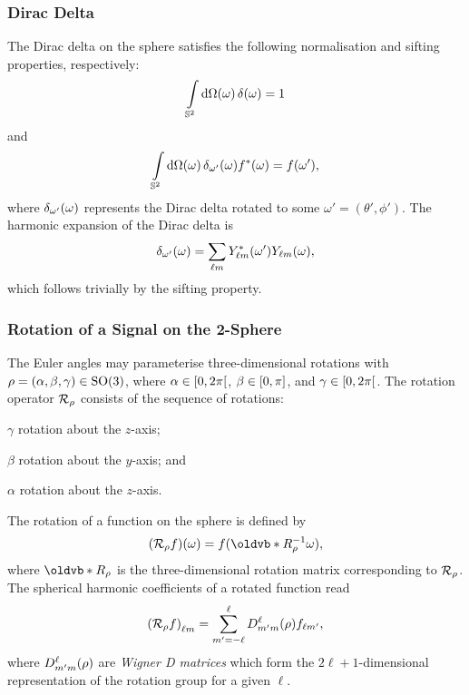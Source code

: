 \subsubsection{Dirac Delta}

The Dirac delta on the sphere satisfies the following normalisation and sifting properties, respectively:
%
\begin{equation}
	\integrateSphere{\omega} \pixel{\delta}
	= 1
\end{equation}
%
and
%
\begin{equation}
	\integrateSphere{\omega} \pixel{\delta_{\omega'}} \pixel{\conj{f}}
	= \pixel[']{f},
\end{equation}
%
where \(\pixel{\delta_{\omega'}}\) represents the Dirac delta rotated to some \(\omega'=(\theta',\phi')\).
The harmonic expansion of the Dirac delta is
%
\begin{equation}\label{eq:chapter2_dirac_omega}
	\pixel{\delta_{\omega'}}
	= \harmonicSum \pixel[']{\conj{\harmonic{Y}}} \pixel{\harmonic{Y}},
\end{equation}
%
which follows trivially by the sifting property.

\subsubsection{Rotation of a Signal on the 2-Sphere}

The Euler angles may parameterise three-dimensional rotations with \(\rho = (\alpha,\beta,\gamma) \in \rotationGroup{}\), where \(\alpha \in \interval[open right]{0}{2\pi}\), \(\beta \in \interval{0}{\pi}\), and \(\gamma \in \interval[open right]{0}{2\pi}\).
The rotation operator \(\rotation{\rho}\) consists of the sequence of rotations:
%
\begin{inparaenum}[(i)]
	\item \({\gamma}\) rotation about the \(z\)-axis;
	\item \({\beta}\) rotation about the \(y\)-axis; and
	\item \({\alpha}\) rotation about the \(z\)-axis.
\end{inparaenum}
%
The rotation of a function on the sphere is defined by
%
\begin{equation}
	\pixel{(\rotation{\rho}f)}
	= f(\vb{R}_{\rho}^{-1} \omega),
\end{equation}
%
where \(\vb{R}_{\rho}\) is the three-dimensional rotation matrix corresponding to \(\rotation{\rho}\).
The spherical harmonic coefficients of a rotated function read
%
\begin{equation}\label{eq:chapter2_rotation_matrix}
	\harmonic{(\rotation{\rho}f)}
	= \sum\limits_{m'=-\ell}^{\ell} \wigner{\ell}{m'}{m}(\rho) f_{\ell m'},
\end{equation}
%
where \(\wigner{\ell}{m'}{m}(\rho)\) are \emph{Wigner D matrices} which form the \(2\ell+1\)-dimensional representation of the rotation group for a given \({\ell}\).

